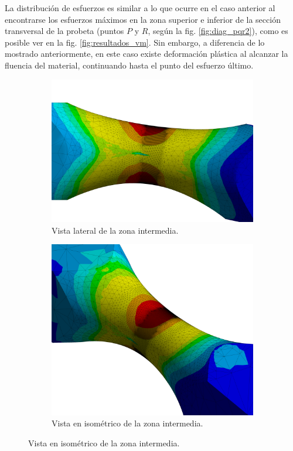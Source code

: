 La distribución de esfuerzos es similar a lo que ocurre en el caso anterior al encontrarse los esfuerzos máximos en la zona superior e inferior de la sección transversal de la probeta (puntos $P$ y $R$, según la fig. \ref{fig:diag_pqr2}), como es posible ver en la fig. \ref{fig:resultados_vm}. Sin embargo, a diferencia de lo mostrado anteriormente, en este caso existe deformación plástica al alcanzar la fluencia del material, continuando hasta el punto del esfuerzo último.


\begin{figure}[p]
\centering
	\begin{subfigure}{0.8\linewidth}
		\centering
		\includegraphics[width=\linewidth]{Imagenes/r_lat.png}
		\caption{Vista lateral de la zona intermedia.}
		\label{fig:r_lat}
	\end{subfigure}
	\begin{subfigure}{0.8\linewidth}
		\centering
		\includegraphics[width=\linewidth]{Imagenes/r_iso.png}
		\caption{Vista en isométrico de la zona intermedia.}
		\label{fig:r_iso}
	\end{subfigure}
\end{figure}
